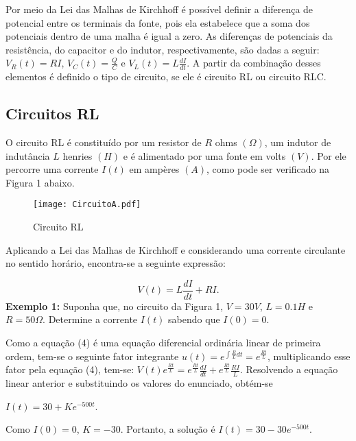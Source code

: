 \documentclass[10pt,twoside,a4paper]{article}
\begin{document}
Por meio da Lei das Malhas de Kirchhoff é possível definir a diferença de potencial entre os terminais da fonte, pois ela estabelece que a soma dos potenciais dentro de uma malha é igual a zero. As diferenças de potenciais da resistência, do capacitor e do indutor, respectivamente, são dadas a seguir: $V_{R}(t) = RI$, $V_{C}(t) = \displaystyle \frac{Q}{C}$ e $V_{L}(t) = \displaystyle L\frac{dI}{dt}$. A partir da combinação desses elementos é definido o tipo de circuito, se ele é circuito RL ou circuito RLC.

\subsection*{Circuitos RL}

O circuito RL é constituído por um resistor de $R$ ohms $(\Omega)$, um indutor de indutância $L$ henries $(H)$ e é alimentado por uma fonte em volts $(V)$. Por ele percorre uma corrente $I(t)$ em ampères $(A)$, como pode ser verificado na Figura 1 abaixo. 

\begin{figure}[!htb]\label{circuito}
\centering
\texttt{[image: CircuitoA.pdf]}
 \caption{Circuito RL}
\end{figure}

Aplicando a Lei das Malhas de Kirchhoff e considerando uma corrente circulante no sentido horário, encontra-se a seguinte expressão:

\begin{equation}
V(t) = L \frac{dI}{dt} + RI.
\end{equation}
{\bf Exemplo 1:} Suponha que, no circuito da Figura 1, $V = 30 V$, $L = 0.1H$ e $R = 50\Omega$. Determine a corrente $I(t)$ sabendo que $I(0) = 0$.

Como a equação (4) é uma equação diferencial ordinária linear de primeira ordem, tem-se o seguinte fator integrante $\displaystyle u(t) = e^{\int \frac{R}{L}dt} = e^{\frac{Rt}{L}}$, multiplicando esse fator pela equação (4), tem-se: $\displaystyle V(t)e^{\frac{Rt}{L}} = e^{\frac{Rt}{L}} \frac{dI}{dt} + e^{\frac{Rt}{L}} \frac{RI}{L}$. 
Resolvendo a equação linear anterior e substituindo os valores do enunciado, obtém-se

\begin{center}
$\displaystyle I(t) = 30 + Ke^{-500t}$.
\end{center}
Como $I(0) = 0$, $K = -30$. Portanto, a solução é $\displaystyle I(t) = 30 - 30e^{-500t}$.
\end{document}
